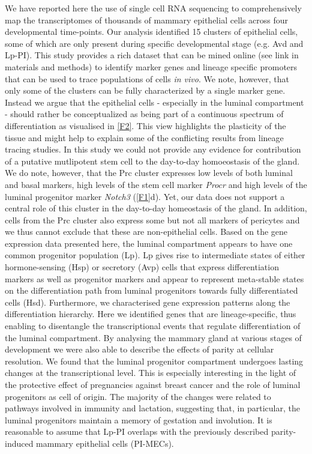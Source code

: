 \documentclass[titlepage, 12pt, oneside]{amsart}
\begin{document}
We have reported here the use of single cell RNA sequencing to comprehensively map the transcriptomes of thousands of mammary epithelial cells across four developmental time-points.
Our analysis identified 15 clusters of epithelial cells, some of which are only present during specific developmental stage (e.g. Avd and Lp-PI).
This study provides a rich dataset that can be mined online (see link in materials and methods) to identify marker genes and lineage specific promoters that can be used to trace populations of cells \textit{in vivo}.
We note, however, that only some of the clusters can be fully characterized by a single marker gene.
Instead we argue that the epithelial cells - especially in the luminal compartment - should rather be conceptualized as being part of a continuous spectrum of differentiation as visualised in \autoref{F2}.
This view highlights the plasticity of the tissue and might help to explain some of the conflicting results from lineage tracing studies\autocite{Inman2015}.
In this study we could not provide any evidence for contribution of a putative mutlipotent stem cell to the day-to-day homoeostasis of the gland.
We do note, however, that the Prc cluster expresses low levels of both luminal and basal markers, high levels of the stem cell marker \textit{Procr}\autocite{Wang2015} and high levels of the luminal progenitor marker \textit{Notch3}\autocite{Lafkas2013} (\autoref{F1}d).
Yet, our data does not support a central role of this cluster in the day-to-day homeostasis of the gland. 
In addition, cells from the Prc cluster also express some but not all markers of pericytes and we thus cannot exclude that these are non-epithelial cells. 
Based on the gene expression data presented here, the luminal compartment appears to have one common progenitor population (Lp).
Lp gives rise to intermediate states of either hormone-sensing (Hsp) or secretory (Avp) cells that express differentiation markers as well as progenitor markers and appear to represent meta-stable states on the differentiation path from luminal progenitors towards fully differentiated cells (Hsd).
Furthermore, we characterised gene expression patterns along the differentiation hierarchy.
Here we identified genes that are lineage-specific, thus enabling to disentangle the transcriptional events that regulate differentiation of the luminal compartment.
By analysing the mammary gland at various stages of development we were also able to describe the effects of parity at cellular resolution.
We found that the luminal progenitor compartment undergoes lasting changes at the transcriptional level.
This is especially interesting in the light of the protective effect of pregnancies against breast cancer and the role of luminal progenitors as cell of origin.
The majority of the changes were related to pathways involved in immunity and lactation, suggesting that, in particular, the luminal progenitors maintain a memory of gestation and involution.
It is reasonable to assume that Lp-PI overlaps with the previously described parity-induced mammary epithelial cells (PI-MECs)\autocite{Wagner2002}.
\end{document}
